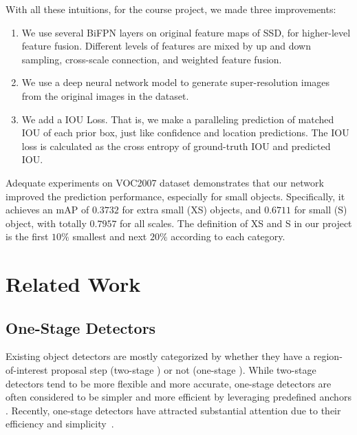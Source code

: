 \documentclass[journal,conference]{IEEEtran}
\begin{document}
With all these intuitions, for the course project, we made three improvements:

\begin{enumerate}
  \item We use several BiFPN layers on original feature maps of SSD, for higher-level feature fusion. Different levels of features are mixed by up and down sampling, cross-scale connection, and weighted feature fusion.
  \item We use a deep neural network model to generate super-resolution images from the original images in the dataset.
  \item We add a IOU Loss. That is, we make a paralleling prediction of matched IOU of each prior box, just like confidence and location predictions. The IOU loss is calculated as the cross entropy of ground-truth IOU and predicted IOU.
\end{enumerate}

Adequate experiments on VOC2007 dataset demonstrates that our network improved the prediction performance, especially for small objects. Specifically, it achieves an mAP of $0.3732$ for extra small (XS) objects, and $0.6711$ for small (S) object, with totally $0.7957$ for all scales. The definition of XS and S in our project is the first $10\%$ smallest and next $20\%$ according to each category.


\section{Related Work}
\subsection{One-Stage Detectors}
Existing object detectors are mostly categorized by whether they have a region-of-interest proposal step (two-stage \cite{rcnn, frcnn, Cai, He}) or not 
(one-stage \cite{sermanetoverfeat, liussd, redmonyolo, linfeature}). 
While two-stage detectors tend to be more flexible and more accurate, one-stage detectors are often considered to be simpler and more efficient by leveraging predefined anchors \cite{huangspeed}. Recently, one-stage detectors have attracted substantial attention due to their efficiency and simplicity~\cite{lawcornernet, zhaodet, zhouobjects}.
\end{document}

